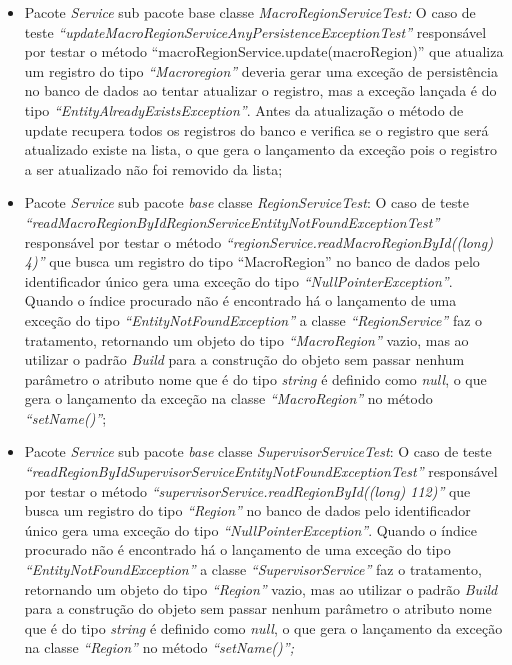 \begin{itemize}
  \item Pacote \textit{Service} sub pacote base classe \textit{MacroRegionServiceTest: }O caso de teste \textit{“updateMacroRegionServiceAnyPersistenceExceptionTest”  }responsável por testar o método “macroRegionService.update(macroRegion)” que atualiza um registro do tipo\textit{ “Macroregion” }deveria gerar uma exceção de persistência no banco de dados   ao tentar atualizar o registro, mas a exceção lançada é do tipo \textit{“EntityAlreadyExistsException”}. Antes da atualização o método de update recupera todos os registros do banco e verifica se o registro que será atualizado existe na lista, o que gera o lançamento da exceção pois o registro a ser atualizado não foi removido da lista;

 \item Pacote \textit{Service} sub pacote \textit{base} classe \textit{RegionServiceTest}: O caso de teste\textit{ “readMacroRegionByIdRegionServiceEntityNotFoundExceptionTest”}  responsável por testar o método\textit{ “regionService.readMacroRegionById((long) 4)”} que busca um registro do tipo “MacroRegion” no banco de dados pelo identificador único gera uma exceção do tipo \textit{“NullPointerException”}. Quando o índice procurado não é encontrado há o lançamento de uma exceção do tipo \textit{“EntityNotFoundException”} a classe \textit{“RegionService”} faz o tratamento, retornando um objeto do tipo \textit{“MacroRegion”} vazio, mas ao utilizar o padrão \textit{Build} para a construção do objeto sem passar nenhum parâmetro o atributo nome que é do tipo \textit{string} é definido como \textit{null}, o que gera o lançamento da exceção na classe \textit{“MacroRegion” }no método \textit{“setName()”};

\item Pacote \textit{Service} sub pacote \textit{base} classe \textit{SupervisorServiceTest}: O caso de teste\textit{ “readRegionByIdSupervisorServiceEntityNotFoundExceptionTest”}  responsável por testar o método \textit{“supervisorService.readRegionById((long) 112)”} que busca um registro do tipo \textit{“Region” }no banco de dados pelo identificador único gera uma exceção do tipo\textit{ “NullPointerException”}. Quando o índice procurado não é encontrado há o lançamento de uma exceção do tipo \textit{“EntityNotFoundException”} a classe \textit{“SupervisorService” }faz o tratamento, retornando um objeto do tipo \textit{“Region” }vazio, mas ao utilizar o padrão \textit{Build} para a construção do objeto sem passar nenhum parâmetro o atributo nome que é do tipo \textit{string} é definido como \textit{null}, o que gera o lançamento da exceção na classe \textit{“Region”} no método \textit{“setName()”;}

    \end{itemize}



